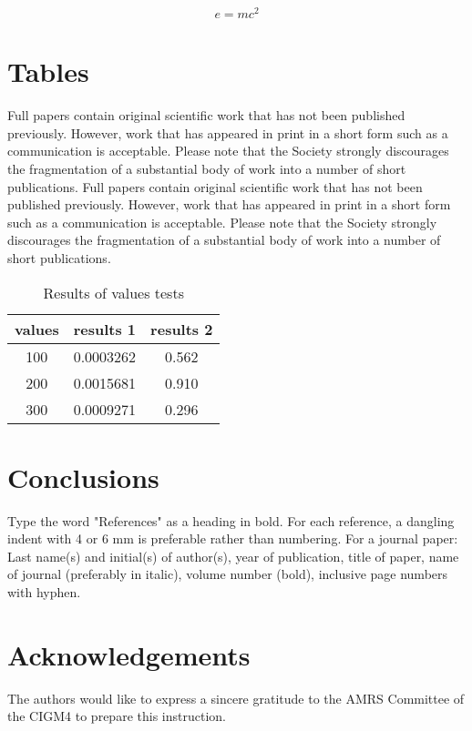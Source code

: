\documentclass[times,twocolumn,5p]{ajam}
\begin{document}
\begin{equation}
\label{eq:emc}
e = mc^2
\end{equation}

\section{Tables}
Full papers contain original scientific work that has not been published previously. However, work that has appeared in print in a short form such as a communication is  acceptable. Please note that the Society strongly discourages the fragmentation of a substantial body of work into a number of short publications. Full papers contain original scientific work that has not been published previously. However, work that has appeared in print in a short form such as a communication is  acceptable. Please note that the Society strongly discourages the fragmentation of a substantial body of work into a number of short publications.

\begin{table}[h]
\centering
\begin{tabular}{c| c c}
\textbf{values} & \textbf{results 1} & \textbf{results 2}\\
\hline
100 & 0.0003262 & 0.562 \\
200 & 0.0015681 & 0.910 \\
300 & 0.0009271 & 0.296 \\
\end{tabular}
\caption{Results of values tests}
\end{table}

\section{Conclusions}
\label{S:2}

Type the word "References" as a heading in bold. For each reference, a dangling indent with 4 or 6 mm is preferable rather than numbering. For a journal paper: Last name(s) and initial(s) of author(s), year of publication, title of paper, name of journal (preferably in italic), volume number (bold), inclusive page numbers with hyphen.

\section{Acknowledgements}
\label{S:3}

The authors would like to express a sincere gratitude to the AMRS Committee of the CIGM4 to prepare this instruction.
\end{document}
